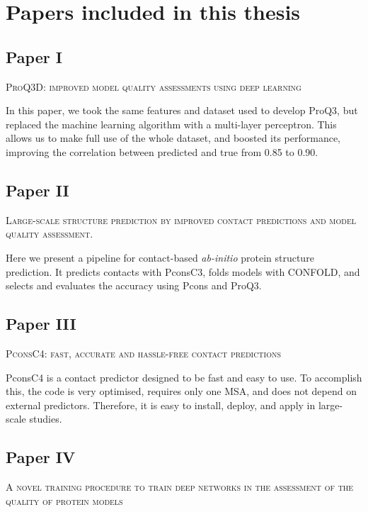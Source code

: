 \chapter{Papers included in this thesis}

\section*{Paper I}
\begin{center}
	\textsc{ProQ3D: improved model quality assessments using deep learning}
\end{center}
\noindent
In this paper, we took the same features and dataset used to develop ProQ3, but replaced the machine learning algorithm with a multi-layer perceptron.
This allows us to make full use of the whole dataset, and boosted its performance, improving the correlation between predicted and true from 0.85 to 0.90.

\section*{Paper II}
\begin{center}
	\textsc{Large-scale structure prediction by improved contact predictions and model quality assessment.}
\end{center}

\noindent
Here we present a pipeline for contact-based \emph{ab-initio} protein structure prediction.
It predicts contacts with PconsC3, folds models with CONFOLD, and selects and evaluates the accuracy using Pcons and ProQ3.
\newpage
\section*{Paper III}
\begin{center}
	\textsc{PconsC4: fast, accurate and hassle-free contact predictions}
\end{center}

\noindent
PconsC4 is a contact predictor designed to be fast and easy to use.
To accomplish this, the code is very optimised, requires only one MSA, and does not depend on external predictors.
Therefore, it is easy to install, deploy, and apply in large-scale studies.


\section*{Paper IV}
\begin{center}
	\textsc{A novel training procedure to train deep networks in the assessment of the quality of protein models}
\end{center}

